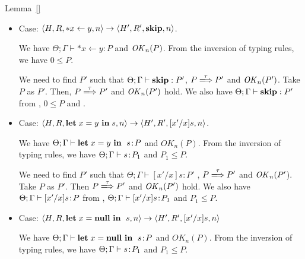 \begin{pfof}{Lemma~\ref{}}
\begin{itemize}
  we have \(\Theta;\Gamma \vdash \SKIP;s\COL  P\) and
  \(\OK_{n}(P)\). From the inversion of the typing rules, we have
  \(\Theta; \Gamma \vdash s\COL P_{1}\) and \(0;P_{1} \le
  P\). Hence, from the definition of subtyping, we have \(P
  \xLongrightarrow{\tau} P''\) and \(P_{1} \le P''\) for some \(P''\).

  We need to find \(P'\) such that \(\Theta; \Gamma \vdash s : P'\)
  and \(P \xLongrightarrow{\tau} P'\). Take \(P''\) as \(P'\). Then \(P
  \xLongrightarrow{\tau} P''\) as we stated above. We also have
  \(\Theta;\Gamma \vdash s\COL P''\) from , \(\Gamma \vdash
  s\COL P_{1}\) and \(P_{1} \le P''\). \(\OK_n(P'')\) follows from
  Lemma~\ref{lem:okPreserved}

\item Case: $\langle H, R, *x \leftarrow y , n \rangle \rightarrow
  \langle H', R', \mathbf{skip}, n \rangle $.

  We have \(\Theta; \Gamma \vdash *x \leftarrow y : P\) and
  \(\OK_{n}(P)\). From the inversion of typing rules, we have \(0 \le
  P\).

  We need to find $P'$ such that \(\Theta; \Gamma \vdash \mathbf{skip}: P'\),
  \(P \xLongrightarrow{\tau} P'\) and \(\mathit{OK}_n(P')\). Take $P$ as $P'$. Then,
  \(P \xLongrightarrow{\tau} P'\) and \(\mathit{OK}_n(P')\) hold. We also have \(\Theta;
  \Gamma \vdash \mathbf{skip}: P'\) from , \(0 \le P\) and
  .

\item Case: $\langle H, R, \mathbf{let}\; x = y\ \mathbf{in}\; s , n \rangle
  \rightarrow \langle H', R', [x'/x]s, n \rangle $.

  We have \(\Theta; \Gamma \vdash \LET x = y\ \IN \ s \COL P\) and
  \(OK_{n}(P)\). From the inversion of typing rules, we have \(\Theta;
  \Gamma \vdash s\COL P_{1}\) and \(P_{1} \le P\).

  We need to find $P'$ such that \(\Theta; \Gamma \vdash [x'/x]s : P'\) ,
  \(P \xLongrightarrow{\tau} P'\) and \(\mathit{OK}_n(P'\)). Take \(P\) as
  \(P'\). Then \( P \xLongrightarrow{\tau} P'\) and \(\mathit{OK}_n(P')\) hold.  We
  also have \(\Theta; \Gamma \vdash [x'/x]s\!:\! P\) from ,
  \(\Theta; \Gamma \vdash [x'/x]s\!:\! P_{1}\) and \( P_{1} \le
  P\).

\item Case: $\langle H, R, \LET x = \NULL \ \IN \ s, n \rangle
  \rightarrow \langle H', R', [x'/x]s, n \rangle $

  We have \(\Theta; \Gamma \vdash \mathbf{let}\; x = \mathbf{null} \ \mathbf{in}\; \ s\!:\! P\)
  and \(OK_{n}(P)\). From the inversion of typing rules, we have
  \(\Theta; \Gamma \vdash s\COL P_{1}\) and \( P_{1} \le P\).


\end{itemize}
\end{pfof}
